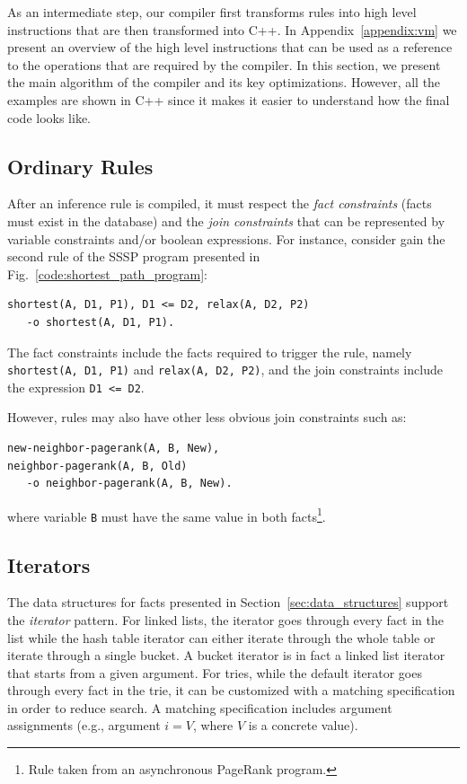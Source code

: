 As an intermediate step, our compiler first transforms rules into high level
instructions that are then transformed into C++. In Appendix~\ref{appendix:vm}
we present an overview of the high level instructions that can be used as a
reference to the operations that are required by the compiler. In this
section, we present the main algorithm of the compiler and its key
optimizations. However, all the examples are shown in C++ since it makes it
easier to understand how the final code looks like.

\subsection{Ordinary Rules}\label{sec:compile}

After an inference rule is compiled, it must respect the \emph{fact constraints}
(facts must exist in the database) and the \emph{join constraints} that can be
represented by variable constraints and/or boolean expressions. For instance,
consider gain the second rule of the SSSP program presented in
Fig.~\ref{code:shortest_path_program}:

\begin{Verbatim}[label=example_rule]
shortest(A, D1, P1), D1 <= D2, relax(A, D2, P2)
   -o shortest(A, D1, P1).
\end{Verbatim}

The fact constraints include the facts required to trigger the rule, namely
\texttt{shortest(A, D1, P1)} and \texttt{relax(A, D2, P2)}, and the join
constraints include the expression \texttt{D1 <= D2}.

However, rules may also have other less obvious join constraints such as:

\begin{Verbatim}
new-neighbor-pagerank(A, B, New),
neighbor-pagerank(A, B, Old)
   -o neighbor-pagerank(A, B, New).
\end{Verbatim}

\noindent
where variable \texttt{B} must have the same value in both facts\footnote{Rule taken
from an asynchronous PageRank program.}.

\subsection{Iterators}

The data structures for facts presented in Section~\ref{sec:data_structures}
support the \emph{iterator} pattern. For linked lists, the iterator goes
through every fact in the list while the hash table iterator can either iterate
through the whole table or iterate through a single bucket. A bucket iterator is
in fact a linked list iterator that starts from a given argument.
For tries, while the default iterator goes through every fact in
the trie, it can be customized with a matching specification in
order to reduce search. A matching specification includes argument
assignments (e.g., argument $i = V$, where $V$ is a concrete value).

